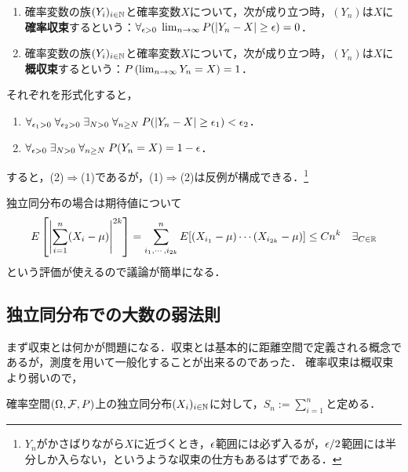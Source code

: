 \documentclass[uplatex,dvipdfmx]{jsreport}
\begin{document}
\begin{definition}\mbox{}
    \begin{enumerate}
        \item 確率変数の族$(Y_i)_{i\in\mathbb{N}}$と確率変数$X$について，次が成り立つ時，$(Y_n)$は$X$に\textbf{確率収束}するという：$\forall_{\epsilon>0}\;\lim_{n\to\infty}P(\lvert Y_n-X\rvert\ge\epsilon)=0$．
        \item 確率変数の族$(Y_i)_{i\in\mathbb{N}}$と確率変数$X$について，次が成り立つ時，$(Y_n)$は$X$に\textbf{概収束}するという：$P\left(\lim_{n\to\infty}Y_n=X\right)=1$．
    \end{enumerate}
    それぞれを形式化すると，
    \begin{enumerate}
        \item $\forall_{\epsilon_1>0}\;\forall_{\epsilon_2>0}\;\exists_{N>0}\;\forall_{n\ge N}\;P(\left|Y_n-X\right|\ge\epsilon_1)<\epsilon_2$．
        \item $\forall_{\epsilon>0}\;\exists_{N>0}\;\forall_{n\ge N}\;P(Y_n=X)=1-\epsilon$．
    \end{enumerate}
    すると，(2)$\Rightarrow$(1)であるが，(1)$\Rightarrow$(2)は反例が構成できる．\footnote{$Y_n$がかさばりながら$X$に近づくとき，$\epsilon$範囲には必ず入るが，$\epsilon/2$範囲には半分しか入らない，というような収束の仕方もあるはずである．}
\end{definition}

独立同分布の場合は期待値について
\[E\left[\left|\sum^n_{i=1}(X_i-\mu)\right|^{2k}\right]=\sum^n_{i_1,\cdots,i_{2k}}E[(X_{i_1}-\mu)\cdots(X_{i_{2k}}-\mu)]\le Cn^k\quad\exists_{C\in\mathbb{R}}\]
という評価が使えるので議論が簡単になる．

\subsection{独立同分布での大数の弱法則}

\begin{tcolorbox}[colframe=ForestGreen, colback=ForestGreen!10!white,breakable,colbacktitle=ForestGreen!40!white,coltitle=black,fonttitle=\bfseries\sffamily,
title=]
    まず収束とは何かが問題になる．収束とは基本的に距離空間で定義される概念であるが，測度を用いて一般化することが出来るのであった．
    確率収束は概収束より弱いので，
\end{tcolorbox}

\begin{notation}
    確率空間$(\Omega,\mathcal{F},P)$上の独立同分布$(X_i)_{i\in\mathbb{N}}$に対して，$S_n:=\sum_{i=1}^n$と定める．
\end{notation}
\end{document}

